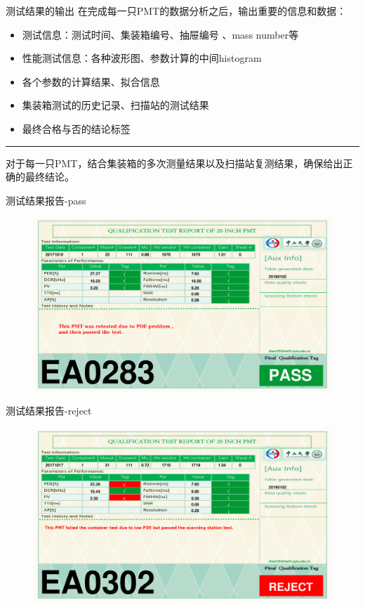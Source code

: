 \documentclass[11pt,compress,xcolor=x11names,UTF8]{beamer}
\begin{document}
\begin{frame}{测试结果的输出}
在完成每一只PMT的数据分析之后，输出重要的信息和数据：
\begin{itemize}
\item 测试信息：测试时间、集装箱编号、抽屉编号 、mass number等
\item 性能测试信息：各种波形图、参数计算的中间histogram
\item 各个参数的计算结果、拟合信息
\item 集装箱测试的历史记录、扫描站的测试结果
\item 最终合格与否的结论标签
\end{itemize} 
\vspace{.5cm}
\hrule{\textwidth}
\vspace{.5cm}
\alert{对于每一只PMT，结合集装箱的多次测量结果以及扫描站复测结果，确保给出正确的最终结论。}
\end{frame}
\begin{frame}{测试结果报告-pass}
\begin{figure}
\centering
\includegraphics[width=1.0\textwidth]{figures/SN_EA0283_pde1_dcr1_HV1_pv1_rt1_tag1.png}
\end{figure}
\end{frame}
\begin{frame}{测试结果报告-reject}
\begin{figure}
\centering
\includegraphics[width=1.0\textwidth]{figures/SN_EA0302_pde0_dcr1_HV1_pv0_rt1_tag0.png}
\end{figure}
\end{frame}
\end{document}
